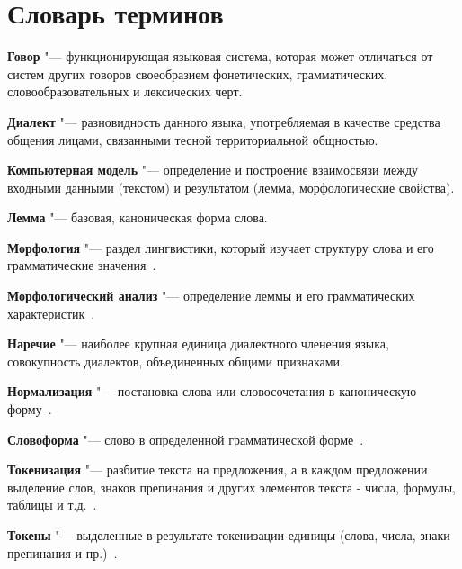 \chapter*{Словарь терминов}             %

\textbf{Говор} "--- функционирующая языковая система, которая может отличаться от систем других говоров своеобразием фонетических, грамматических, словообразовательных и лексических черт.~
\cite{NovakPenttonenRuuskanenSiilin2019}

\textbf{Диалект} "--- разновидность данного языка, употребляемая в качестве средства общения лицами, связанными тесной территориальной общностью.~
\cite{NovakPenttonenRuuskanenSiilin2019}

\textbf{Компьютерная модель} "--- определение и построение взаимосвязи между входными данными (текстом) и результатом (лемма, морфологические свойства).

\textbf{Лемма} "--- базовая, каноническая форма слова.

\textbf{Морфология} "--- раздел лингвистики, который изучает структуру слова и его грамматические значения~\cite{MitreninaNikolaevLando2016}.

\textbf{Морфологический анализ} "--- определение леммы и его грамматических характеристик~\cite{MitreninaNikolaevLando2016}.

\textbf{Наречие} "--- наиболее крупная единица диалектного членения языка, совокупность диалектов, объединенных общими признаками.~
\cite{NovakPenttonenRuuskanenSiilin2019}

\textbf{Нормализация} "--- постановка слова или словосочетания в каноническую форму~\cite{MitreninaNikolaevLando2016}.

\textbf{Словоформа} "--- слово в определенной грамматической форме~\cite{MitreninaNikolaevLando2016}.

\textbf{Токенизация} "--- разбитие текста на предложения, а в каждом предложении выделение слов, знаков препинания и других элементов текста - числа, формулы, таблицы и т.д.~\cite{MitreninaNikolaevLando2016}.

\textbf{Токены} "--- выделенные в результате токенизации единицы (слова, числа, знаки препинания и пр.)~\cite{MitreninaNikolaevLando2016}.
